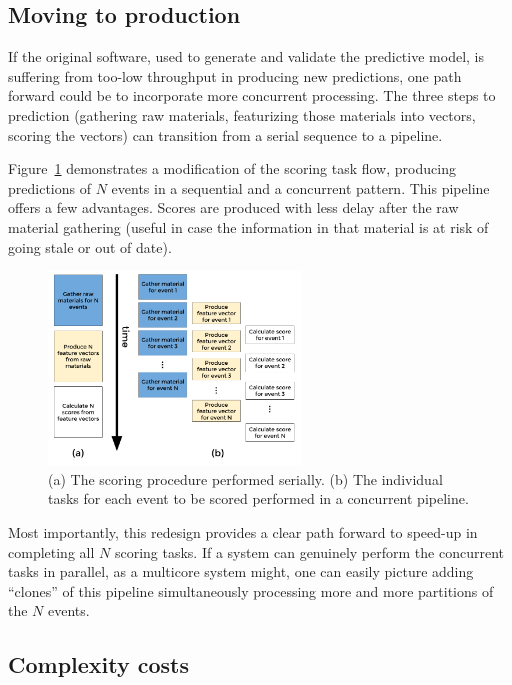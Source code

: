 \documentclass[tablecaption=bottom,wcp]{jmlr}
\begin{document}
\subsection{Moving to production}

 If the original software, used to generate and validate the predictive model,
is suffering from too-low throughput in producing new predictions, one path
forward could be to incorporate more concurrent processing. The three steps to
prediction (gathering raw materials, featurizing those materials into vectors,
scoring the vectors) can transition from a serial sequence to a pipeline.

  Figure~\ref{fig_pipeline} demonstrates a modification of the scoring task flow, producing
predictions of $N$ events in a sequential and a concurrent pattern.  This
pipeline offers a few advantages. Scores are produced with less delay after the
raw material gathering (useful in case the information in that material is at
risk of going stale or out of date).

\begin{figure}[h]
\includegraphics[width=0.6\textwidth]{fig/tex/pipeline.png}
\centering
\caption{(a) The scoring procedure performed serially. (b) The individual tasks
for each event to be scored performed in a concurrent pipeline.}
\label{fig_pipeline}
\end{figure}


 Most importantly, this redesign provides a clear path forward to speed-up in
completing all $N$ scoring tasks. If a system can genuinely perform the
concurrent tasks in parallel, as a multicore system might, one can easily
picture adding ``clones'' of this pipeline simultaneously processing more and
more partitions of the $N$ events.

\subsection{Complexity costs}
\end{document}
